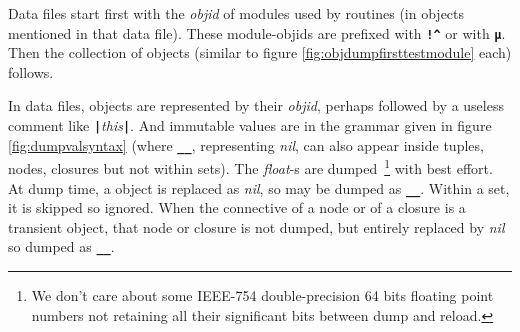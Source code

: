 {Data files start
first with the \emph{objid} of modules used by routines (in objects
mentioned in that data file). These module-objids are prefixed with
{\bf{\verb+!^+}} or with {\bf{\texttt{µ}}}. Then the collection of
objects (similar to figure \ref{fig:objdumpfirsttestmodule} each)
follows.



In data files, objects are represented by their \emph{objid}, perhaps
followed by a useless comment like
{\bf{\verb+|+}}\emph{this}{\bf{\verb+|+}}. And immutable values are in
the grammar given in figure \ref{fig:dumpvalsyntax} (where
\textbf{\texttt{\_\_}}, representing \emph{nil}, can also appear
inside tuples, nodes, closures but not within sets). The
\emph{float}-s are dumped~\footnote{ We don't care about some IEEE-754
  double-precision 64 bits floating point numbers not retaining all
  their significant bits between dump and reload.} with best
effort. At dump time, a  object is
replaced as \emph{nil}, so may be dumped as
\textbf{\texttt{\_\_}}. Within a set, it is skipped so ignored. When
the connective of a node or of a closure is a transient object, that
node or closure is not dumped, but entirely replaced by \emph{nil} so
dumped as \textbf{\texttt{\_\_}}.

}
